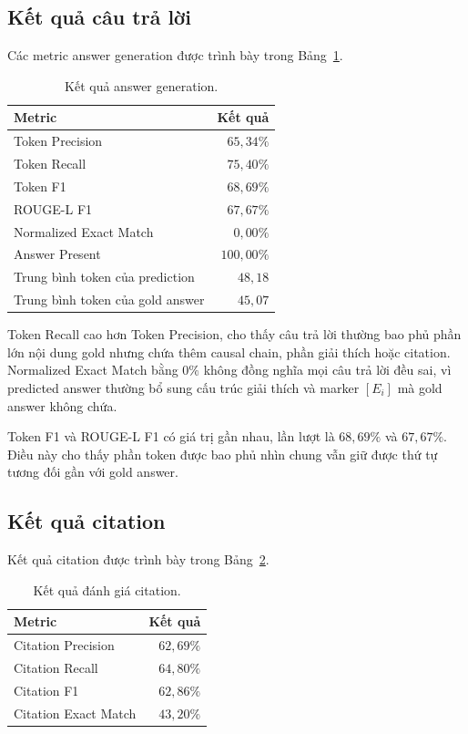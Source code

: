 \subsection{Kết quả câu trả lời}

Các metric answer generation được trình bày trong
Bảng~\ref{tab:answer-results}.

\begin{table}[t]
    \centering
    \caption{Kết quả answer generation.}
    \label{tab:answer-results}
    \begin{tabular}{lr}
        \hline
        \textbf{Metric} & \textbf{Kết quả} \\
        \hline
        Token Precision & \(65{,}34\%\) \\
        Token Recall & \(75{,}40\%\) \\
        Token F1 & \(68{,}69\%\) \\
        ROUGE-L F1 & \(67{,}67\%\) \\
        Normalized Exact Match & \(0{,}00\%\) \\
        Answer Present & \(100{,}00\%\) \\
        Trung bình token của prediction & \(48{,}18\) \\
        Trung bình token của gold answer & \(45{,}07\) \\
        \hline
    \end{tabular}
\end{table}

Token Recall cao hơn Token Precision, cho thấy câu trả lời thường bao phủ
phần lớn nội dung gold nhưng chứa thêm causal chain, phần giải thích hoặc
citation. Normalized Exact Match bằng \(0\%\) không đồng nghĩa mọi câu trả
lời đều sai, vì predicted answer thường bổ sung cấu trúc giải thích và marker
\([E_i]\) mà gold answer không chứa.

Token F1 và ROUGE-L F1 có giá trị gần nhau, lần lượt là \(68{,}69\%\) và
\(67{,}67\%\). Điều này cho thấy phần token được bao phủ nhìn chung vẫn giữ
được thứ tự tương đối gần với gold answer.

\subsection{Kết quả citation}

Kết quả citation được trình bày trong Bảng~\ref{tab:citation-results}.

\begin{table}[t]
    \centering
    \caption{Kết quả đánh giá citation.}
    \label{tab:citation-results}
    \begin{tabular}{lr}
        \hline
        \textbf{Metric} & \textbf{Kết quả} \\
        \hline
        Citation Precision & \(62{,}69\%\) \\
        Citation Recall & \(64{,}80\%\) \\
        Citation F1 & \(62{,}86\%\) \\
        Citation Exact Match & \(43{,}20\%\) \\
        \hline
    \end{tabular}
\end{table}


